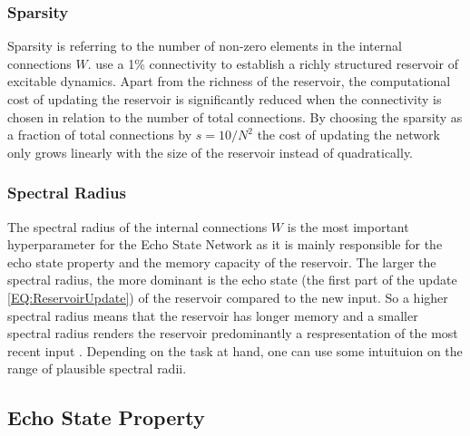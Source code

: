 \subsubsection{Sparsity}

Sparsity is referring to the number of non-zero elements in the internal connections $W$. \cite{Jaeger2004Harness} use a 1\% connectivity to establish a richly structured reservoir of excitable dynamics. Apart from the richness of the reservoir, the computational cost of updating the reservoir is significantly reduced when the connectivity is chosen in relation to the number of total connections. By choosing the sparsity as a fraction of total connections by $s = 10/N^2$ the cost of updating the network only grows linearly with the size of the reservoir instead of quadratically.

\subsubsection{Spectral Radius}

The spectral radius of the internal connections $W$ is the most important hyperparameter for the Echo State Network as it is mainly responsible for the echo state property and the memory capacity of the reservoir. The larger the spectral radius, the more dominant is the echo state (the first part of the update \ref{EQ:ReservoirUpdate}) of the reservoir compared to the new input. So a higher spectral radius means that the reservoir has longer memory and a smaller spectral radius renders the reservoir predominantly a respresentation of the most recent input \citep{Lukosecicius2012}. Depending on the task at hand, one can use some intuituion on the range of plausible spectral radii.


\subsection{Echo State Property}
\label{CH:ESN:ESP}

